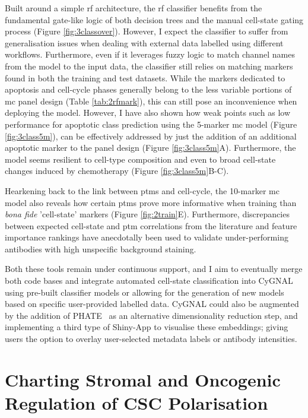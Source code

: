Built around a simple \acrfull{rf} architecture, the \acrshort{rf} classifier benefits from the fundamental gate-like logic of both decision trees and the manual cell-state gating process (Figure \ref{fig:3classover}). However, I expect the classifier to suffer from generalisation issues when dealing with external data labelled using different workflows. Furthermore, even if it leverages fuzzy logic to match channel names from the model to the input data, the classifier still relies on matching markers found in both the training  and test datasets. While the markers dedicated to apoptosis and cell-cycle phases generally belong to the less variable portions of \acrshort{mc} panel design (Table \ref{tab:2rfmark}), this can still pose an inconvenience when deploying the model. However, I have also shown how weak points such as low performance for apoptotic class prediction using the 5-marker \acrshort{mc} model (Figure \ref{fig:3class5m}), can be effectively addressed by just the addition of an additional apoptotic marker to the panel design (Figure \ref{fig:3class5m}A). Furthermore, the model seems resilient to cell-type composition and even to broad cell-state changes induced by chemotherapy (Figure \ref{fig:3class5m}B-C).

Hearkening back to the link between \acrshort{ptm}s and cell-cycle, the 10-marker \acrshort{mc} model also reveals how certain \acrshort{ptm}s prove more informative when training than \emph{bona fide} 'cell-state' markers (Figure \ref{fig:2train}E). Furthermore, discrepancies between expected cell-state and \acrshort{ptm} correlations from the literature and feature importance rankings have anecdotally been used to validate under-performing antibodies with high unspecific background staining.

Both these tools remain under continuous support, and I aim to eventually merge both code bases and integrate automated cell-state classification into CyGNAL using pre-built classifier models or allowing for the generation of new models based on specific user-provided labelled data.
CyGNAL could also be augmented by the addition of PHATE~\cite{moon_visualizing_2019} as an alternative dimensionality reduction step, and implementing a third type of Shiny-App to visualise these embeddings; giving users the option to overlay user-selected metadata labels or antibody intensities.

\newpage
\section{Charting Stromal and Oncogenic Regulation of CSC Polarisation}

